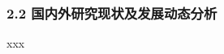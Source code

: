 \subsubsection{2.2 国内外研究现状及发展动态分析}
xxx



%
%
%

\begingroup
\let\itshape\upshape

\fontsize{10pt}{10pt}\selectfont



\endgroup

\newpage